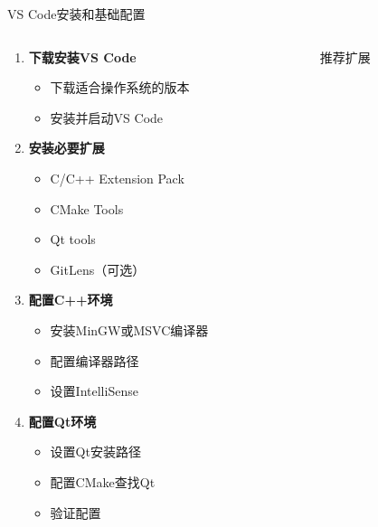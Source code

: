 \documentclass[UTF8,aspectratio=169]{beamer}
\begin{document}
\begin{frame}{VS Code安装和基础配置}
    \begin{columns}
        \begin{column}{0.48\textwidth}
            \begin{enumerate}
                \item \textbf{下载安装VS Code}
                    \begin{itemize}
                        \item 下载适合操作系统的版本
                        \item 安装并启动VS Code
                    \end{itemize}
                \item \textbf{安装必要扩展}
                    \begin{itemize}
                        \item C/C++ Extension Pack
                        \item CMake Tools
                        \item Qt tools
                        \item GitLens（可选）
                    \end{itemize}
                \item \textbf{配置C++环境}
                    \begin{itemize}
                        \item 安装MinGW或MSVC编译器
                        \item 配置编译器路径
                        \item 设置IntelliSense
                    \end{itemize}
                \item \textbf{配置Qt环境}
                    \begin{itemize}
                        \item 设置Qt安装路径
                        \item 配置CMake查找Qt
                        \item 验证配置
                    \end{itemize}
            \end{enumerate}
        \end{column}
        \hspace{0.02\textwidth}
        \begin{column}{0.48\textwidth}
            \begin{ytublock}{推荐扩展}

\end{ytublock}
\end{column}
\end{columns}
\end{frame}
\end{document}
